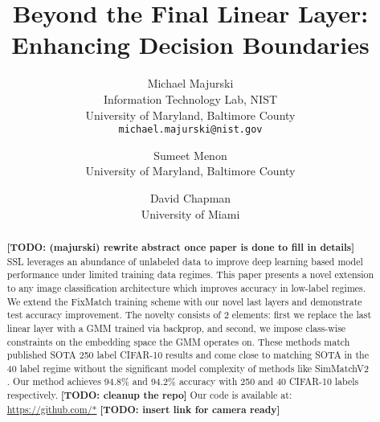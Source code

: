 \documentclass[10pt,twocolumn,letterpaper]{article}
\newcommand{\TODO}[1]{\textbf{\color{red}[TODO: #1]}}
\begin{document}
	
\title{Beyond the Final Linear Layer: Enhancing Decision Boundaries}

\author{Michael Majurski\\
	Information Technology Lab, NIST\\
	University of Maryland, Baltimore County\\
	{\tt\small michael.majurski@nist.gov}
\and
Sumeet Menon\\
University of Maryland, Baltimore County\\
\and
David Chapman\\
University of Miami\\
}

\maketitle


\begin{abstract}
\TODO {(majurski) rewrite abstract once paper is done to fill in details}
SSL leverages an abundance of unlabeled data to improve deep learning based model performance under limited training data regimes.
This paper presents a novel extension to any image classification architecture which improves accuracy in low-label regimes. 
We extend the FixMatch \cite{sohn2020fixmatch} training scheme with our novel last layers and demonstrate test accuracy improvement. 
The novelty consists of 2 elements: first we replace the last linear layer with a GMM trained via backprop, and second, we impose class-wise constraints on the embedding space the GMM operates on.
These methods match published SOTA 250 label CIFAR-10 \cite{cifar10} results and come close to matching SOTA in the 40 label regime without the significant model complexity of methods like SimMatchV2 \cite{zheng2023simmatchv2}.
Our method achieves 94.8\% and 94.2\% accuracy with 250 and 40 CIFAR-10 labels respectively.
\TODO {cleanup the repo}
Our code is available at: \url{https://github.com/*} \TODO {insert link for camera ready} %
\end{abstract}
\end{document}
